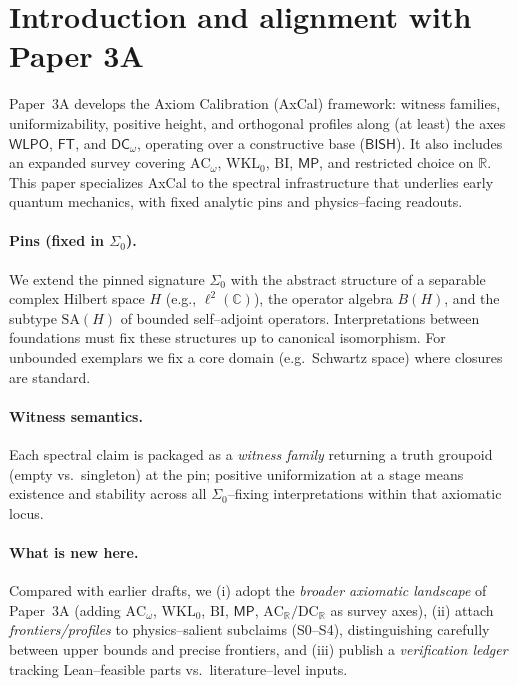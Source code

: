 \documentclass[11pt]{article}
\newcommand{\WLPO}{\mathsf{WLPO}}
\newcommand{\FT}{\mathsf{FT}}
\newcommand{\DCw}{\mathsf{DC}_{\omega}}
\newcommand{\MP}{\mathsf{MP}}
\theoremstyle{plain}
\theoremstyle{definition}
\theoremstyle{remark}
\newcommand{\R}{\mathbb{R}}
\newcommand{\C}{\mathbb{C}}
\newcommand{\BISH}{\mathsf{BISH}}
\newcommand{\ACw}{\mathrm{AC}_\omega}
\newcommand{\ACR}{\mathrm{AC}_{\mathbb{R}}}
\newcommand{\DCR}{\mathrm{DC}_{\mathbb{R}}}
\newcommand{\WKLz}{\mathrm{WKL}_0}
\newcommand{\BI}{\mathrm{BI}}
\newcommand{\SigmaZero}{\Sigma_{0}}
\begin{document}
\section{Introduction and alignment with Paper 3A}

Paper~3A \cite{Paper3A} develops the Axiom Calibration (AxCal) framework: witness families, uniformizability, positive height, and orthogonal profiles
along (at least) the axes $\WLPO$, $\FT$, and $\DCw$, operating over a constructive base ($\BISH$). It also includes an expanded survey covering $\ACw$, $\WKLz$, $\BI$, $\MP$, and restricted choice on $\R$.
This paper specializes AxCal to the spectral infrastructure that underlies early quantum mechanics,
with fixed analytic pins and physics--facing readouts.

\paragraph{Pins (fixed in $\SigmaZero$).}
We extend the pinned signature $\SigmaZero$ with the abstract structure of a separable complex Hilbert space $H$ (e.g., $\ell^2(\C)$), the operator algebra $B(H)$,
and the subtype $\mathrm{SA}(H)$ of bounded self--adjoint operators. Interpretations between foundations must fix these structures up to canonical isomorphism. For unbounded exemplars we fix a
core domain (e.g.\ Schwartz space) where closures are standard.

\paragraph{Witness semantics.}
Each spectral claim is packaged as a \emph{witness family} returning a truth groupoid (empty vs.\ singleton)
at the pin; positive uniformization at a stage means existence and stability across all $\SigmaZero$--fixing interpretations within that axiomatic locus.

\paragraph{What is new here.}
Compared with earlier drafts, we (i) adopt the \emph{broader axiomatic landscape} of Paper~3A (adding $\ACw$, $\WKLz$, $\BI$, $\MP$, $\ACR/\DCR$ as survey axes), (ii) attach \emph{frontiers/profiles} to physics--salient subclaims (S0--S4), distinguishing carefully between upper bounds and precise frontiers, and (iii) publish a \emph{verification ledger} tracking Lean--feasible parts vs.\ literature--level inputs.
\end{document}
